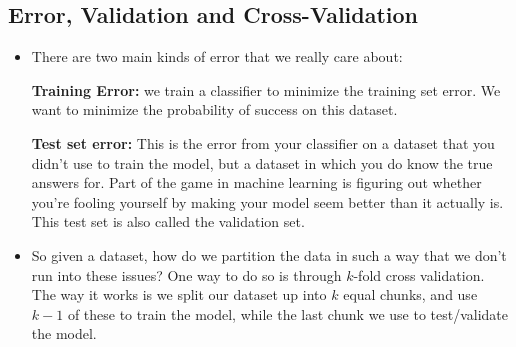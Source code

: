 \subsection{Error, Validation and Cross-Validation}
\begin{itemize}
	\item There are two main kinds of error that we really care about:

		\textbf{Training Error:} we train a classifier to minimize the training set
		error. We want to minimize the probability of success on this dataset. 
		

		\textbf{Test set error:} This is the error from your classifier on a dataset
		that you didn't use to train the model, but a dataset in which you do know
		the true answers for. Part of the game in machine learning is figuring out
		whether you're fooling yourself by making your model seem better than it
		actually is. This test set is also called the validation set. 
	\item So given a dataset, how do we partition the data in such a way that we
		don't run into these issues? One way to do so is through \( k \)-fold cross
		validation. The way it works is we split our dataset up into \( k \) equal
		chunks, and use \( k-1 \) of these to train the model, while the last chunk
		we use to test/validate the model. 
\end{itemize}


